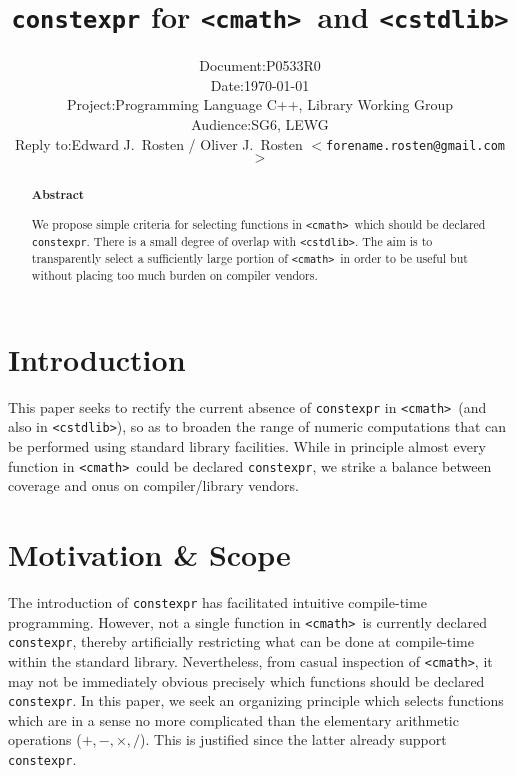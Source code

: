 \documentclass[prd,twocolumn,amsmath,amssymb,nofootinbib,eqsecnum]{revtex4-1}
\newcommand{\constexpr}{\code{constexpr}\xspace}
\newcommand{\code}[1]{{\tt #1}}
\newcommand{\header}[1]{{\tt <#1>}}
\newcommand{\cmath}{\header{cmath}}
\newcommand{\cstdlib}{\header{cstdlib}}
\newcommand{\Operators}{\ensuremath{+,-,\times,/}}
\begin{document}
\title{\constexpr for \cmath\ and \cstdlib}

\author{
\hspace{11.5em}
\begin{tabular}{ll}
	Document: & P0533R0
\\
	Date: & \today
\\
	Project: & Programming Language C++, Library Working Group
\\
	Audience: & SG6, LEWG
\\
	Reply to: & Edward J.\ Rosten / Oliver J.\ Rosten 
	{\tt $<$forename.rosten@gmail.com$>$}
\end{tabular}
}

\begin{abstract}

\begin{center} {\bf Abstract} \end{center}
We propose simple criteria for selecting functions in \cmath\ which should be
declared \constexpr. There is a small degree of overlap with \cstdlib.
 The aim is to transparently select a sufficiently large portion of \cmath\ 
in order to be useful but without placing too much burden on compiler vendors.
	
\end{abstract}


\maketitle

\tableofcontents

\section{Introduction}

This paper seeks to rectify the current absence of \constexpr in
\cmath\ (and also in \cstdlib), so as to broaden the range of numeric computations that can be
performed using standard library facilities. While in principle almost every function
in \cmath\ could be declared \constexpr, we strike a balance between coverage and onus on compiler/library vendors.


\section{Motivation \& Scope}

The introduction of \constexpr has facilitated intuitive compile-time
programming. However, not a single function in \cmath\ is currently declared \constexpr,
thereby artificially restricting what can be done at compile-time within the standard library.
Nevertheless, from casual inspection of \cmath, it may
not be immediately obvious precisely which functions should be declared
\constexpr. In this paper, we seek an organizing principle which selects functions
which are in a sense no more complicated than the elementary arithmetic operations
(\Operators). This is justified since the latter already support \constexpr.
\end{document}
